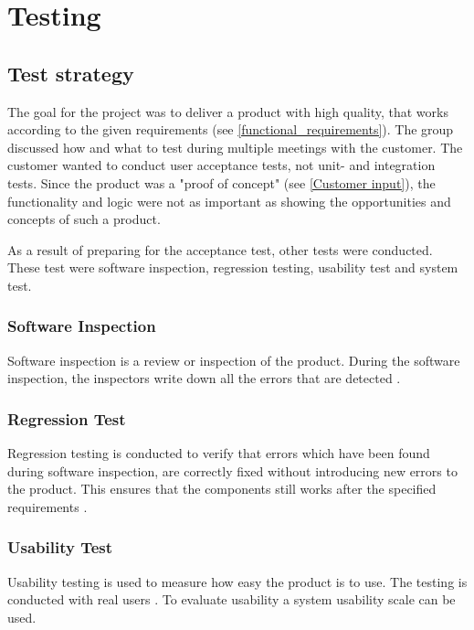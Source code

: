 
\chapter{Testing}
\label{Testing}

\section{Test strategy}
The goal for the project was to deliver a product with high quality, that works according to the given requirements (see \ref{functional_requirements}). The group discussed how and what to test during multiple meetings with the customer. The customer wanted to conduct user acceptance tests, not unit- and integration tests. Since the product was a "proof of concept" (see \ref{Customer input}), the functionality and logic were not as important as showing the opportunities and concepts of such a product.

As a result of preparing for the acceptance test, other tests were conducted. These test were software inspection, regression testing, usability test and system test. 

\subsection{Software Inspection}
\label{software_inspection}
Software inspection is a review or inspection of the product. During the software inspection, the inspectors write down all the errors that are detected \cite{softwareInspection}.

\subsection{Regression Test}
\label{regression_test}
Regression testing is conducted to verify that errors which have been found during software inspection, are correctly fixed without introducing new errors to the product. This ensures that the components still works after the specified requirements \cite{regressionTest}.

\subsection{Usability Test}
Usability testing is used to measure how easy the product is to use. The testing is conducted with real users \cite{usabiliyTest}. To evaluate usability a system usability scale can be used.

